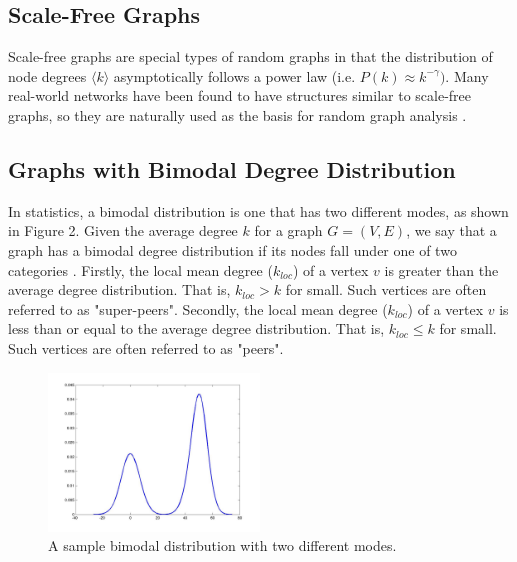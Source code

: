\documentclass[doc]{apa}%
\begin{document}

\subsection{Scale-Free Graphs}
Scale-free graphs are special types of random graphs in that the distribution of node degrees $\langle k \rangle$ asymptotically follows a power law (i.e. $P(k) \approx k^{-\gamma})$. Many real-world networks have been found to have structures similar to scale-free graphs, so they are naturally used as the basis for random graph analysis \cite{AttacksWavesRandom}. 


\subsection{Graphs with Bimodal Degree Distribution}

In statistics, a bimodal distribution is one that has two different modes, as shown in Figure 2. Given the average degree $k$ for a graph $G = (V,E)$, we say that a graph has a bimodal degree distribution if its nodes fall under one of two categories \cite{bimodal}. Firstly, the local mean degree ($k_{loc}$) of a vertex $v$ is greater than the average degree distribution. That is, $k_{loc} > k$ for small. Such vertices are often referred to as "super-peers". Secondly, the local mean degree ($k_{loc}$) of a vertex $v$ is less than or equal to the average degree distribution. That is, $k_{loc} \leq k$ for small. Such vertices are often referred to as "peers".

\begin{figure}[h!]
	\label{fig:bimodalDist}
	\centering
		\includegraphics[width=0.5\textwidth]{bimodal.jpg}
	\caption{A sample bimodal distribution with two different modes.}
\end{figure}
\end{document}
